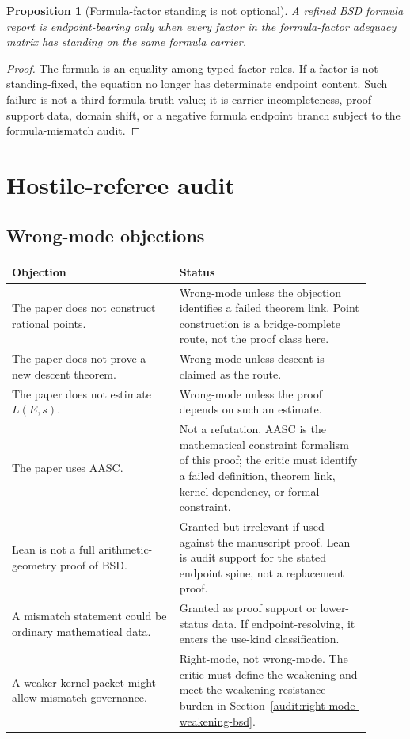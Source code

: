\documentclass[11pt]{article}
\newtheorem{proposition}[theorem]{Proposition}
\begin{document}
\begin{proposition}[Formula-factor standing is not optional]
A refined BSD formula report is endpoint-bearing only when every factor in the formula-factor adequacy matrix has standing on the same formula carrier.
\end{proposition}

\begin{proof}
The formula is an equality among typed factor roles. If a factor is not standing-fixed, the equation no longer has determinate endpoint content. Such failure is not a third formula truth value; it is carrier incompleteness, proof-support data, domain shift, or a negative formula endpoint branch subject to the formula-mismatch audit.
\end{proof}


\section{Hostile-referee audit}

\subsection{Wrong-mode objections}
\begin{longtable}{L{0.42\linewidth}L{0.48\linewidth}}
\toprule
\textbf{Objection} & \textbf{Status}\\
\midrule
The paper does not construct rational points. & Wrong-mode unless the objection identifies a failed theorem link. Point construction is a bridge-complete route, not the proof class here.\\
The paper does not prove a new descent theorem. & Wrong-mode unless descent is claimed as the route.\\
The paper does not estimate $L(E,s)$. & Wrong-mode unless the proof depends on such an estimate.\\
The paper uses AASC. & Not a refutation. AASC is the mathematical constraint formalism of this proof; the critic must identify a failed definition, theorem link, kernel dependency, or formal constraint.\\
Lean is not a full arithmetic-geometry proof of BSD. & Granted but irrelevant if used against the manuscript proof. Lean is audit support for the stated endpoint spine, not a replacement proof.\\
A mismatch statement could be ordinary mathematical data. & Granted as proof support or lower-status data. If endpoint-resolving, it enters the use-kind classification.\\
A weaker kernel packet might allow mismatch governance. & Right-mode, not wrong-mode. The critic must define the weakening and meet the weakening-resistance burden in Section~\ref{audit:right-mode-weakening-bsd}.\\
\bottomrule
\end{longtable}
\end{document}
